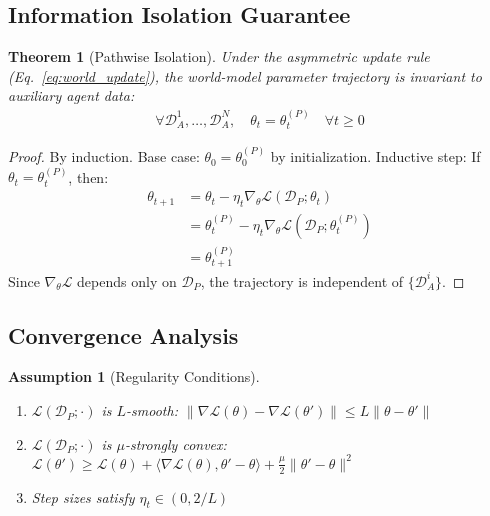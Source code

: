 \documentclass[12pt, a4paper]{article}
\newtheorem{theorem}{Theorem}
\newtheorem{assumption}{Assumption}
\begin{document}
\subsection{Information Isolation Guarantee}

\begin{theorem}[Pathwise Isolation]\label{thm:isolation}
Under the asymmetric update rule (Eq.~\ref{eq:world_update}), the world-model parameter trajectory is invariant to auxiliary agent data:
\begin{align}
\forall \mathcal{D}_A^1, \ldots, \mathcal{D}_A^N, \quad \theta_t = \theta_t^{(P)} \quad \forall t \geq 0
\end{align}
\end{theorem}

\begin{proof}
By induction. Base case: $\theta_0 = \theta_0^{(P)}$ by initialization. Inductive step: If $\theta_t = \theta_t^{(P)}$, then:
\begin{align}
\theta_{t+1} &= \theta_t - \eta_t \nabla_\theta \mathcal{L}(\mathcal{D}_P; \theta_t)\\
&= \theta_t^{(P)} - \eta_t \nabla_\theta \mathcal{L}(\mathcal{D}_P; \theta_t^{(P)})\\
&= \theta_{t+1}^{(P)}
\end{align}
Since $\nabla_\theta \mathcal{L}$ depends only on $\mathcal{D}_P$, the trajectory is independent of $\{\mathcal{D}_A^i\}$.
\end{proof}

\subsection{Convergence Analysis}

\begin{assumption}[Regularity Conditions]\label{ass:regularity}
\begin{enumerate}
\item $\mathcal{L}(\mathcal{D}_P; \cdot)$ is $L$-smooth: $\|\nabla \mathcal{L}(\theta) - \nabla \mathcal{L}(\theta')\| \leq L\|\theta - \theta'\|$
\item $\mathcal{L}(\mathcal{D}_P; \cdot)$ is $\mu$-strongly convex: $\mathcal{L}(\theta') \geq \mathcal{L}(\theta) + \langle\nabla\mathcal{L}(\theta), \theta'-\theta\rangle + \frac{\mu}{2}\|\theta'-\theta\|^2$
\item Step sizes satisfy $\eta_t \in (0, 2/L)$
\end{enumerate}
\end{assumption}
\end{document}
